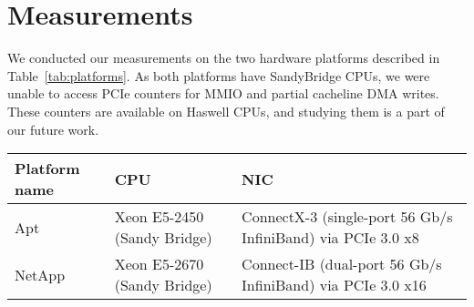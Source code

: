 \section{Measurements}
\label{sec:measurements}
We conducted our measurements on the two hardware platforms described in
Table~\ref{tab:platforms}. As both platforms have SandyBridge CPUs, we were
unable to access PCIe counters for MMIO and partial cacheline DMA writes.
These counters are available on Haswell CPUs, and studying them is a part of
our future work.

\begin{table*}[h]
\begin{center}
    \begin{tabular}{p{2.5cm} p{6cm} p{10cm}}
	\textbf{Platform name} & \textbf{CPU} & \textbf{NIC}\\
    \hline
	Apt & Xeon E5-2450 (Sandy Bridge) & ConnectX-3 (single-port 56 Gb/s InfiniBand) via PCIe 3.0 x8 \\
	NetApp & Xeon E5-2670 (Sandy Bridge) & Connect-IB (dual-port 56 Gb/s InfiniBand) via PCIe 3.0 x16 \\
    \end{tabular}
\caption{Measurement platforms.}
\label{tab:platforms}
\end{center}
\end{table*}

